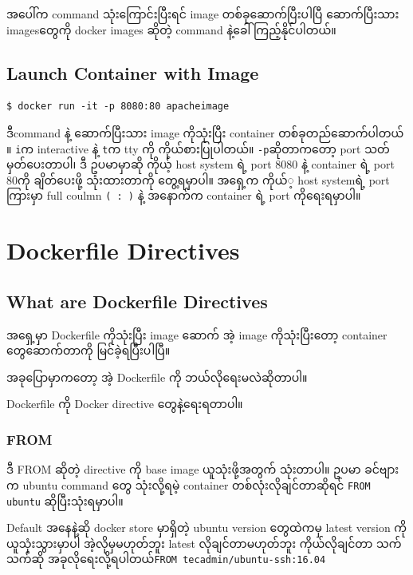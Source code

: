 \documentclass{article}
\begin{document}
အ​ပေါ်က command သုံး​ကြောင်းပြီးရင်​ image တစ်​ခု​ဆောက်​ပြီးပါပြီ
​ဆောက်​ပြီးသား images ​တွေကို docker images ဆိုတဲ့ command
နဲ့​ခေါ်ကြည့်နိုင်​ပါတယ်​။

\subsection{Launch Container with
Image}\label{launch-container-with-image}

\begin{verbatim}
$ docker run -it -p 8080:80 apacheimage
\end{verbatim}

ဒီcommand နဲ့ ​ဆောက်​ပြီးသား image ကိုသုံးပြီး container
တစ်​ခုတည်​​ဆောက်​ပါတယ်​။ \texttt{i}က interactive နဲ့ \texttt{t}က tty ကို
ကိုယ်​စားပြုပါတယ်​။ \texttt{-p}ဆိုတာက​တော့ port သတ်​မှတ်​​ပေးတာပါ၊ ဒီ
ဥပမာမှာဆို ကိုယ့် host system ရဲ့ port 8080 နဲ့ container ရဲ့ port 80ကို
ချိတ်​​ပေးဖို့ သုံးထားတာကို ​တွေ့ရမှာပါ။ အ​ရှေ့က ကိုယ်​့ host systemရဲ့
port ကြားမှာ full coulmn \texttt{( : )} နဲ့ အ​နောက်​က container ရဲ့ port
ကို​ရေးရမှာပါ။

\pagebreak

\section{Dockerfile Directives}\label{dockerfile-directives}

\subsection{What are Dockerfile
Directives}\label{what-are-dockerfile-directives}

အ​ရှေ့မှာ Dockerfile ကိုသုံးပြီး image ​ဆောက်​ အဲ့ image
ကိုသုံးပြီး​တော့ container ​တွေ ​ဆောက်​တာကို မြင်​ခဲ့ရပြီးပါပြီ။

အခု​ပြောမှာက​တော့ အဲ့ Dockerfile ကို ဘယ်​လို​ရေးမလဲဆိုတာပါ။

Dockerfile ကို Docker directive ​တွေနဲ့​ရေးရတာပါ။

\subsubsection{FROM}\label{from}

ဒီ FROM ဆိုတဲ့ directive ကို base image ယူသုံးဖို့အတွက်​ သုံးတာပါ။ ဥပမာ
ခင်​​ဗျားက ubuntu command ​တွေ သုံးလို့ရမဲ့ container
တစ်​လုံးလိုချင်​တာဆိုရင်​ \texttt{FROM ubuntu} ဆိုပြီးသုံးရမှာပါ။

Default အ​နေနဲ့ဆို docker store မှာရှိတဲ့ ubuntu version ​တွေထဲကမှ
latest version ကို ယူသုံးသွားမှာပါ အဲ့လိုမှမဟုတ်​ဘူး latest
လိုချင်​တာမဟုတ်​ဘူး ကိုယ်​လိုချင်​တာ သက်​သက်​ဆို အခုလို​ရေးလို့ရပါတယ်​
\texttt{FROM tecadmin/ubuntu-ssh:16.04}
\end{document}

